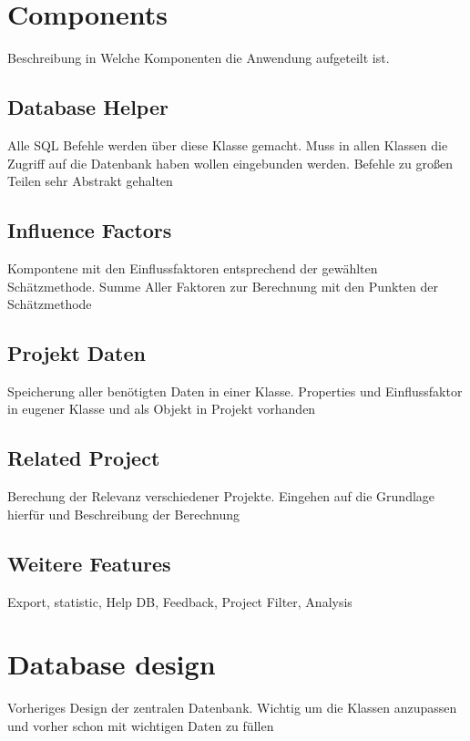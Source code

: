 \section{Components}

Beschreibung in Welche Komponenten die Anwendung aufgeteilt ist.

\subsection{Database Helper}

Alle SQL Befehle werden über diese Klasse gemacht. Muss in allen Klassen die Zugriff auf die Datenbank haben wollen eingebunden werden. Befehle zu großen Teilen sehr Abstrakt gehalten

\subsection{Influence Factors}

Kompontene mit den Einflussfaktoren entsprechend der gewählten Schätzmethode. Summe Aller Faktoren zur Berechnung mit den Punkten der Schätzmethode

\subsection{Projekt Daten}

Speicherung aller benötigten Daten in einer Klasse. Properties und Einflussfaktor in eugener Klasse und als Objekt in Projekt vorhanden

\subsection{Related Project}

Berechung der Relevanz verschiedener Projekte. Eingehen auf die Grundlage hierfür und Beschreibung der Berechnung 

\subsection{Weitere Features}

Export, statistic, Help DB, Feedback, Project Filter, Analysis


\section{Database design}

Vorheriges Design der zentralen Datenbank. Wichtig um die Klassen anzupassen und vorher schon mit wichtigen Daten zu füllen

